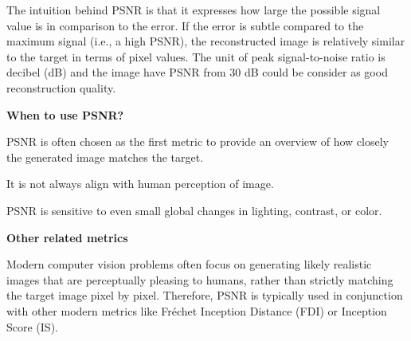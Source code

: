 \begin{center}
\end{center}

\vspace{-10pt}

The intuition behind PSNR is that it expresses how large the possible signal value is in comparison to the error. 
If the error is subtle compared to the maximum signal (i.e., a high PSNR), the reconstructed image is relatively similar to the target in terms of pixel values.
The unit of peak signal-to-noise ratio is decibel (dB) and the image have PSNR from 30 dB could be consider as good reconstruction quality.



\textbf{When to use PSNR?}

PSNR is often chosen as the first metric to provide an overview of how closely the generated image matches the target.

{
\item It is not always align with human perception of image.
\item PSNR is sensitive to even small global changes in lighting, contrast, or color.
}


\textbf{Other related metrics}

Modern computer vision problems often focus on generating likely realistic images that are perceptually pleasing to humans, rather than strictly matching the
target image pixel by pixel. Therefore, PSNR is typically used in conjunction with other modern metrics like Fréchet Inception Distance (FDI) or Inception Score (IS).


